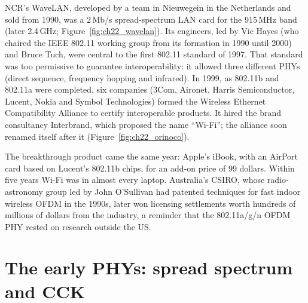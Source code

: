 \begin{history}
NCR's WaveLAN, developed by a team in Nieuwegein in the Netherlands and sold from 1990, was a
2\,Mb/s spread-spectrum LAN card for the 915\,MHz band (later 2.4\,GHz;
Figure~\ref{fig:ch22_wavelan}). Its engineers, led by Vic Hayes (who chaired the IEEE 802.11 working
group from its formation in 1990 until 2000) and Bruce Tuch, were central to the first 802.11
standard of 1997. That standard was too permissive to guarantee interoperability: it allowed three
different PHYs (direct sequence, frequency hopping and infrared). In 1999, as 802.11b and 802.11a
were completed, six companies (3Com, Aironet, Harris Semiconductor, Lucent, Nokia and Symbol
Technologies) formed the Wireless Ethernet Compatibility Alliance to certify interoperable
products. It hired the brand consultancy Interbrand, which proposed the name ``Wi-Fi''; the
alliance soon renamed itself after it (Figure~\ref{fig:ch22_orinoco}).

The breakthrough product came the same year: Apple's iBook, with an AirPort card based on
Lucent's 802.11b chips, for an add-on price of 99 dollars. Within five years Wi-Fi was in almost
every laptop. Australia's CSIRO, whose radio-astronomy group led by John O'Sullivan had patented
techniques for fast indoor wireless OFDM in the 1990s, later won licensing settlements worth
hundreds of millions of dollars from the industry, a reminder that the 802.11a/g/n OFDM PHY rested
on research outside the US.
\end{history}



\section{The early PHYs: spread spectrum and CCK}
\label{sec:ch22:early}

